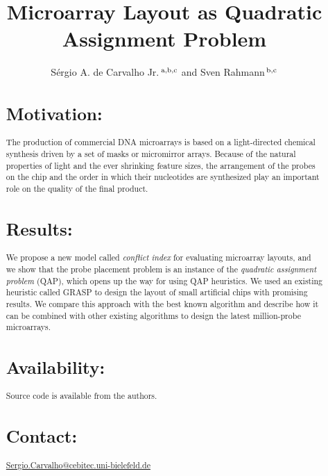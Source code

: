 \documentclass{bioinfo}
\begin{document}

\title{Microarray Layout as Quadratic Assignment Problem}
\author[de Carvalho Jr. and Rahmann]{S\'ergio A. de Carvalho Jr.\,$^{\rm a,b,c}$ and Sven Rahmann\,$^{\rm b,c}$}
\address{$^{\rm a}$Graduiertenkolleg Bioinformatik, Bielefeld University, Germany,\\
  $^{\rm b}$International NRW Graduate School for Bioinformatics and Genome Research, Bielefeld University, Germany,\\
  $^{\rm c}$Algorithms and Statistics for Systems Biology group, Genome Informatics, Technische Fakult\"at, Bielefeld University, D-33594 Bielefeld, Germany.
}
\maketitle

\begin{abstract}
\section{Motivation:}
The production of commercial DNA microarrays is based on a
light-directed chemical synthesis driven by a set of masks or
micromirror arrays. Because of the natural properties of light and the
ever shrinking feature sizes, the arrangement of the probes on the
chip and the order in which their nucleotides are synthesized play an
important role on the quality of the final product.
\section{Results:}
We propose a new model called \emph{conflict index} for evaluating
microarray layouts, and we show that the probe placement problem is an
instance of the \emph{quadratic assignment problem} (QAP), which opens
up the way for using QAP heuristics. We used an existing heuristic
called GRASP to design the layout of small artificial chips with
promising results. We compare this approach with the best known
algorithm and describe how it can be combined with other existing
algorithms to design the latest million-probe microarrays.
\section{Availability:}
Source code is available from the authors.
\section{Contact:} \href{Sergio.Carvalho@cebitec.uni-bielefeld.de}{Sergio.Carvalho@cebitec.uni-bielefeld.de}
\end{abstract}
\end{document}
